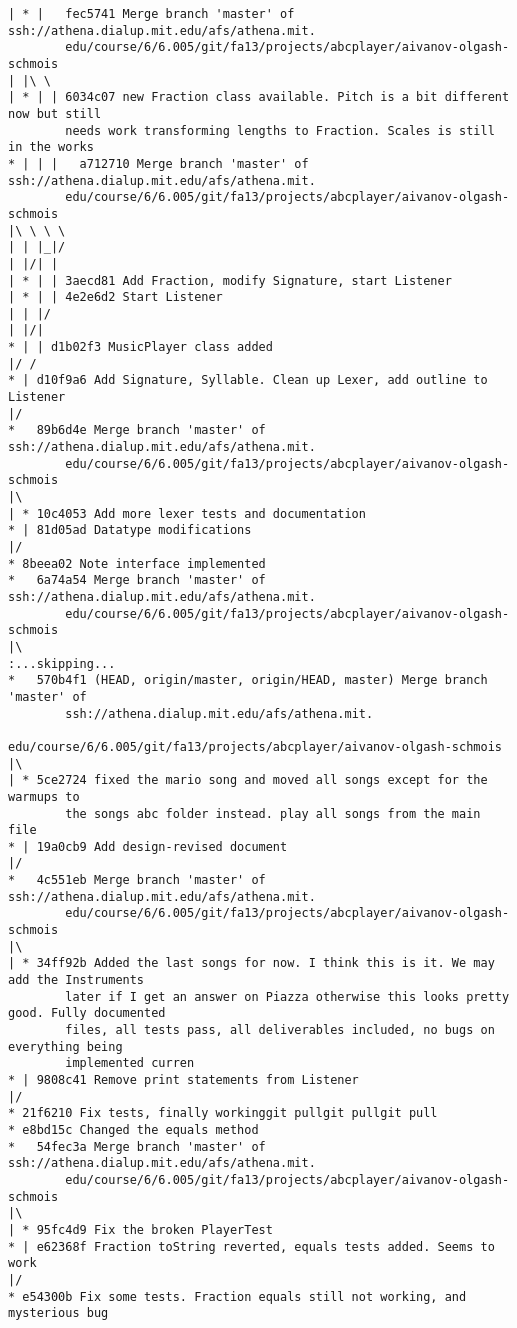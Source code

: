 \documentclass[12pt]{book}
\begin{document}
\begin{Verbatim}
| * |   fec5741 Merge branch 'master' of ssh://athena.dialup.mit.edu/afs/athena.mit.
        edu/course/6/6.005/git/fa13/projects/abcplayer/aivanov-olgash-schmois
| |\ \
| * | | 6034c07 new Fraction class available. Pitch is a bit different now but still 
        needs work transforming lengths to Fraction. Scales is still in the works
* | | |   a712710 Merge branch 'master' of ssh://athena.dialup.mit.edu/afs/athena.mit.
        edu/course/6/6.005/git/fa13/projects/abcplayer/aivanov-olgash-schmois
|\ \ \ \
| | |_|/
| |/| |
| * | | 3aecd81 Add Fraction, modify Signature, start Listener
| * | | 4e2e6d2 Start Listener
| | |/
| |/|
* | | d1b02f3 MusicPlayer class added
|/ /
* | d10f9a6 Add Signature, Syllable. Clean up Lexer, add outline to Listener
|/
*   89b6d4e Merge branch 'master' of ssh://athena.dialup.mit.edu/afs/athena.mit.
        edu/course/6/6.005/git/fa13/projects/abcplayer/aivanov-olgash-schmois
|\
| * 10c4053 Add more lexer tests and documentation
* | 81d05ad Datatype modifications
|/
* 8beea02 Note interface implemented
*   6a74a54 Merge branch 'master' of ssh://athena.dialup.mit.edu/afs/athena.mit.
        edu/course/6/6.005/git/fa13/projects/abcplayer/aivanov-olgash-schmois
|\
:...skipping...
*   570b4f1 (HEAD, origin/master, origin/HEAD, master) Merge branch 'master' of 
        ssh://athena.dialup.mit.edu/afs/athena.mit.
                edu/course/6/6.005/git/fa13/projects/abcplayer/aivanov-olgash-schmois
|\
| * 5ce2724 fixed the mario song and moved all songs except for the warmups to 
        the songs abc folder instead. play all songs from the main file
* | 19a0cb9 Add design-revised document
|/
*   4c551eb Merge branch 'master' of ssh://athena.dialup.mit.edu/afs/athena.mit.
        edu/course/6/6.005/git/fa13/projects/abcplayer/aivanov-olgash-schmois
|\
| * 34ff92b Added the last songs for now. I think this is it. We may add the Instruments 
        later if I get an answer on Piazza otherwise this looks pretty good. Fully documented 
        files, all tests pass, all deliverables included, no bugs on everything being 
        implemented curren
* | 9808c41 Remove print statements from Listener
|/
* 21f6210 Fix tests, finally workinggit pullgit pullgit pull
* e8bd15c Changed the equals method
*   54fec3a Merge branch 'master' of ssh://athena.dialup.mit.edu/afs/athena.mit.
        edu/course/6/6.005/git/fa13/projects/abcplayer/aivanov-olgash-schmois
|\
| * 95fc4d9 Fix the broken PlayerTest
* | e62368f Fraction toString reverted, equals tests added. Seems to work
|/
* e54300b Fix some tests. Fraction equals still not working, and mysterious bug 

\end{Verbatim}
\end{document}
